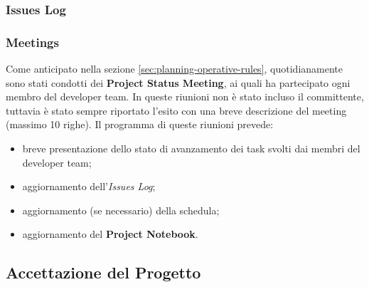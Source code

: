 \subsubsection{Issues Log}

\subsubsection{Meetings}
Come anticipato nella sezione \ref{sec:planning-operative-rules}, quotidianamente sono stati condotti dei \textbf{Project Status Meeting}, ai quali ha partecipato ogni membro del developer team. In queste riunioni non è stato incluso il committente, tuttavia è stato sempre riportato l'esito con una breve descrizione del meeting (massimo 10 righe). Il programma di queste riunioni prevede:
\begin{itemize}
    \item breve presentazione dello stato di avanzamento dei task svolti dai membri del developer team;
    \item aggiornamento dell'\textit{Issues Log};
    \item aggiornamento (se necessario) della schedula;
    \item aggiornamento del \textbf{Project Notebook}.
\end{itemize}

\subsection{Accettazione del Progetto}

